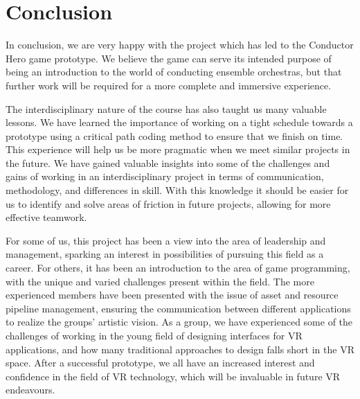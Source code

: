 \chapter{Conclusion}
In conclusion, we are very happy with the project which has led to the Conductor Hero game prototype. We believe the game can serve its intended purpose of being an introduction to the world of conducting ensemble orchestras, but that further work will be required for a more complete and immersive experience.

The interdisciplinary nature of the course has also taught us many valuable lessons.
We have learned the importance of working on a tight schedule towards a prototype using a critical path coding method to ensure that we finish on time. This experience will help us be more pragmatic when we meet similar projects in the future. We have gained valuable insights into some of the challenges and gains of working in an interdisciplinary project in terms of communication, methodology, and differences in skill. With this knowledge it should be easier for us to identify and solve areas of friction in future projects, allowing for more effective teamwork. 

For some of us, this project has been a view into the area of leadership and management, sparking an interest in possibilities of pursuing this field as a career. For others, it has been an introduction to the area of game programming, with the unique and varied challenges present within the field. The more experienced members have been presented with the issue of asset and resource pipeline management, ensuring the communication between different applications to realize the groups’ artistic vision. As a group, we have experienced some of the challenges of working in the young field of designing interfaces for VR applications, and how many traditional approaches to design falls short in the VR space. After a successful prototype, we all have an increased interest and confidence in the field of VR technology, which will be invaluable in future VR endeavours. 


